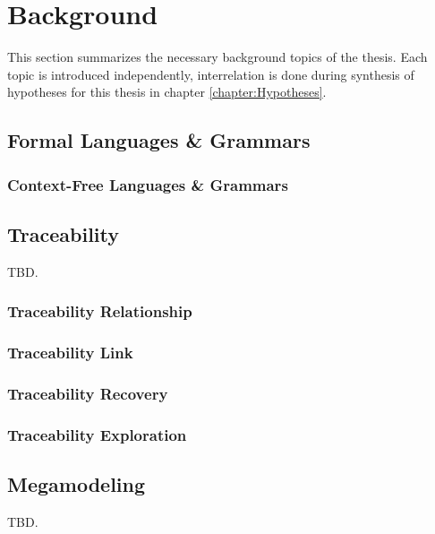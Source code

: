 \chapter{Background}
\label{chapter:Background}
This section summarizes the necessary background topics of the thesis.
Each topic is introduced independently, interrelation is done during synthesis of hypotheses for this thesis in chapter \ref{chapter:Hypotheses}.





\section{Formal Languages \& Grammars}
\subsection{Context-Free Languages \& Grammars}

\section{Traceability}
\cite{Winkler:2010:STR:1861285.1861287}
TBD.
\subsection{Traceability Relationship}
\subsection{Traceability Link}
\subsection{Traceability Recovery}
\subsection{Traceability Exploration}

\section{Megamodeling}
TBD.

\subsection{\megal}
\subsubsection{\megalxtext}

